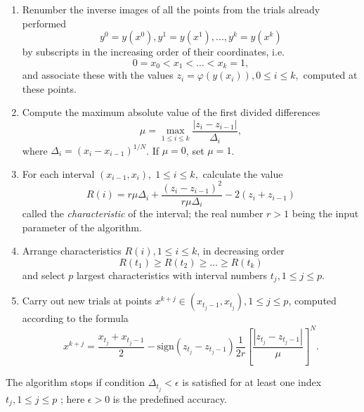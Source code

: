 \documentclass{svproc}
\begin{document}
\begin{enumerate}
	\item 
	Renumber the inverse images of all the points from the trials already performed  
\begin{equation}\label{y_i}
y^0=y(x^0), y^1=y(x^1),...,y^k=y(x^k)
\end{equation}
by subscripts in the increasing order of their coordinates, i.e.
\begin{equation}\label{x_i}
0=x_0<x_1<\dots <x_k=1,
\end{equation}
and associate these with the values $z_i=\varphi(y(x_i)), 0\leq i \leq k,$  computed at these points.
\item
Compute the maximum absolute value of the first divided differences
\begin{equation}\label{mu}
\mu = \max_{1 \leq i \leq k}\frac{\left|z_i-z_{i-1}\right|}{\Delta_i},
\end{equation}
where $\Delta_i=\left(x_i-x_{i-1}\right)^{1/N}$. If $\mu = 0$, set $\mu = 1$.
\item
For each interval $(x_{i-1}, x_i), \; 1\leq i \leq k,$  calculate the value
\begin{equation}\label{R}
R(i)=r\mu\Delta_i+\frac{(z_i-z_{i-1})^2}{r\mu\Delta_i}-2(z_i+z_{i-1})
\end{equation}
called the \textit{characteristic} of the interval; the real number $r>1$ being the input parameter of the algorithm.

\item 
Arrange characteristics  $R(i), 1 \leq i \leq k$, in decreasing order 
\begin{equation}\label{Rdec}
R(t_1)\geq R(t_2)\geq \dots \geq R(t_{k})
\end{equation}
and select $p$ largest characteristics with interval numbers $t_j, 1\leq j \leq p$.
\item
Carry out new trials at points $x^{k+j}\in(x_{t_j-1},x_{t_j}), 1\leq j\leq p$, computed according to the formula
\[
x^{k+j} = \frac{x_{t_j}+x_{t_j-1}}{2} - \mathrm{sign}(z_{t_j}-z_{t_j-1})\frac{1}{2r}\left[\frac{\left|z_{t_j}-z_{t_j-1}\right|}{\mu}\right]^N.
\]

\end{enumerate}

The algorithm stops if condition $\Delta_{t_j}<\epsilon$ is satisfied for at least one index $t_j, 1 \leq j \leq p$ ; here $\epsilon>0$ is the predefined accuracy. 
\end{document}
